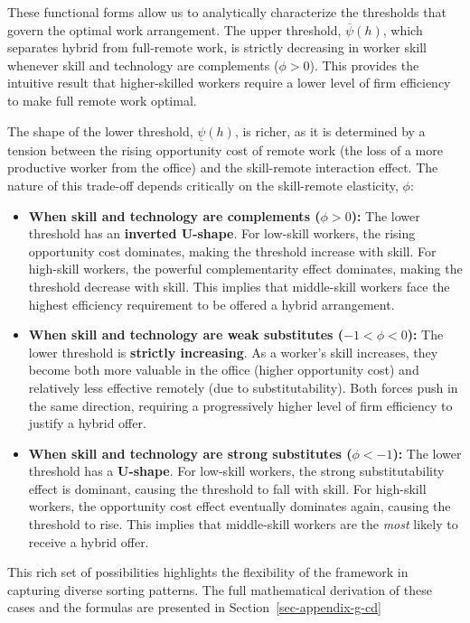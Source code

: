 \documentclass[
  11pt,
  letterpaper,
  DIV=11,
  numbers=noendperiod]{scrartcl}
\begin{document}
These functional forms allow us to analytically characterize the
thresholds that govern the optimal work arrangement. The upper
threshold, \(\overline{\psi}(h)\), which separates hybrid from
full-remote work, is strictly decreasing in worker skill whenever skill
and technology are complements (\(\phi > 0\)). This provides the
intuitive result that higher-skilled workers require a lower level of
firm efficiency to make full remote work optimal.

The shape of the lower threshold, \(\underline{\psi}(h)\), is richer, as
it is determined by a tension between the rising opportunity cost of
remote work (the loss of a more productive worker from the office) and
the skill-remote interaction effect. The nature of this trade-off
depends critically on the skill-remote elasticity, \(\phi\):

\begin{itemize}
\item
  \textbf{When skill and technology are complements (\(\phi > 0\)):} The
  lower threshold has an \textbf{inverted U-shape}. For low-skill
  workers, the rising opportunity cost dominates, making the threshold
  increase with skill. For high-skill workers, the powerful
  complementarity effect dominates, making the threshold decrease with
  skill. This implies that middle-skill workers face the highest
  efficiency requirement to be offered a hybrid arrangement.
\item
  \textbf{When skill and technology are weak substitutes
  (\(-1 < \phi < 0\)):} The lower threshold is \textbf{strictly
  increasing}. As a worker's skill increases, they become both more
  valuable in the office (higher opportunity cost) and relatively less
  effective remotely (due to substitutability). Both forces push in the
  same direction, requiring a progressively higher level of firm
  efficiency to justify a hybrid offer.
\item
  \textbf{When skill and technology are strong substitutes
  (\(\phi < -1\)):} The lower threshold has a \textbf{U-shape}. For
  low-skill workers, the strong substitutability effect is dominant,
  causing the threshold to fall with skill. For high-skill workers, the
  opportunity cost effect eventually dominates again, causing the
  threshold to rise. This implies that middle-skill workers are the
  \emph{most} likely to receive a hybrid offer.
\end{itemize}

This rich set of possibilities highlights the flexibility of the
framework in capturing diverse sorting patterns. The full mathematical
derivation of these cases and the formulas are presented in
Section~\ref{sec-appendix-g-cd}
\end{document}
